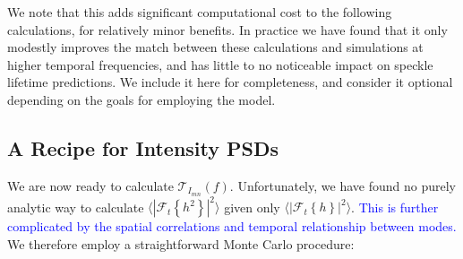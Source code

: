 \documentclass[10pt,preprint]{aastex631}
\newcommand{\jrmadd}[1]{\textcolor{blue}{#1}}
\begin{document}
We note that this adds significant computational cost to the following calculations, for relatively minor benefits.  In practice we have found that it only modestly improves the match between these calculations and simulations at higher temporal frequencies, and has little to no noticeable impact on speckle lifetime predictions.  We include it here for completeness, and consider it optional depending on the goals for employing the model.

\subsection{A Recipe for Intensity PSDs}
\label{sec:recipe}
We are now ready to calculate $\mathcal{T}_{I_{mn}}(f)$.  Unfortunately, we have found no purely analytic way to calculate $\langle \left| \mathcal{F}_t\left\{ h^2 \right\} \right|^2 \rangle$ given only $\langle \left| \mathcal{F}_t\left\{ h \right\} \right|^2 \rangle$. \jrmadd{ This is further complicated by the spatial correlations and temporal relationship between modes.}  We therefore employ a straightforward Monte Carlo procedure:
\end{document}
